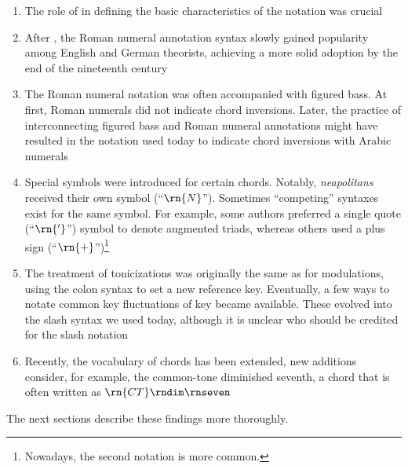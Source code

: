 \begin{enumerate}
    \item The role of \textcite{weber1817versuch} in
    defining the basic characteristics of the notation was
    crucial
    \item After \textcite{weber1817versuch}, the Roman
    numeral annotation syntax slowly gained popularity among
    English and German theorists, achieving a more solid
    adoption by the end of the nineteenth century
    \item The Roman numeral notation was often accompanied
    with figured bass. At first, Roman numerals did not
    indicate chord inversions. Later, the practice of
    interconnecting figured bass and Roman numeral
    annotations might have resulted in the notation used
    today to indicate chord inversions with Arabic numerals
    \item Special symbols were introduced for certain
    chords. Notably, \emph{neapolitans} received their own
    symbol (``$\rn{N}$''). Sometimes ``competing'' syntaxes
    exist for the same symbol. For example, some authors
    preferred a single quote (``$\rn{'}$'') symbol to denote
    augmented triads, whereas others used a plus sign
    (``$\rn{+}$'')\footnote{Nowadays, the second notation is
    more common.}
    \item The treatment of tonicizations was originally the
    same as for modulations, using the colon syntax to set a
    new reference key. Eventually, a few ways to notate
    common key fluctuations of key became available. These
    evolved into the slash syntax we used today, although it
    is unclear who should be credited for the slash notation
    \item Recently, the vocabulary of chords has been
    extended, new additions consider, for example, the
    common-tone diminished seventh, a chord that is often
    written as $\rn{CT}\rndim\rnseven$
\end{enumerate}

The next sections describe these findings more thoroughly.
